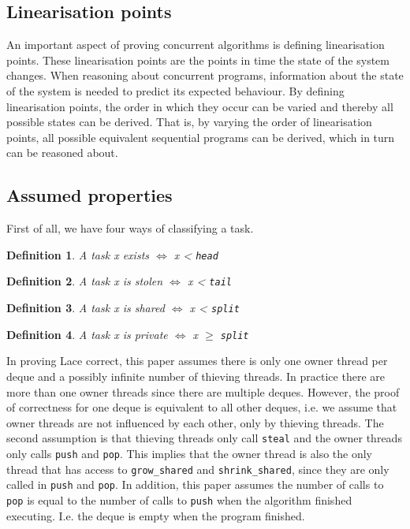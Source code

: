 \documentclass{sig-alternate-br}
\newtheorem{definition}{Definition}
\begin{document}
\subsection{Linearisation points}
\label{sec:lin}
An important aspect of proving concurrent algorithms is defining linearisation points\cite{herlihy1990}.
These linearisation points are the points in time the state of the system changes.
When reasoning about concurrent programs, information about the state of the system is needed to predict its expected behaviour.
By defining linearisation points, the order in which they occur can be varied and thereby all possible states can be derived.
That is, by varying the order of linearisation points, all possible equivalent sequential programs can be derived, which in turn can be reasoned about.

\subsection{Assumed properties}
First of all, we have four ways of classifying a task.
\begin{definition}A task x exists $\iff$ x < \texttt{head}\end{definition}
\begin{definition}A task x is stolen $\iff$ x < \texttt{tail}\end{definition}
\begin{definition}A task x is shared $\iff$ x < \texttt{split}\end{definition}
\begin{definition}A task x is private $\iff$ x $\geq$ \texttt{split}\end{definition}
In proving Lace correct, this paper assumes there is only one owner thread per deque and a possibly infinite number of thieving threads.
In practice there are more than one owner threads since there are multiple deques.
However, the proof of correctness for one deque is equivalent to all other deques, i.e. we assume that owner threads are not influenced by each other, only by thieving threads.
The second assumption is that thieving threads only call \texttt{steal} and the owner threads only calls \texttt{push}  and \texttt{pop}.
This implies that the owner thread is also the only thread that has access to \texttt{grow\_shared}  and \texttt{shrink\_shared}, since they are only called in \texttt{push} and \texttt{pop}.
In addition, this paper assumes the number of calls to \texttt{pop} is equal to the number of calls to \texttt{push} when the algorithm finished executing. I.e. the deque is empty when the program finished.
\end{document}
